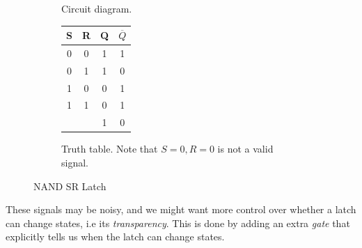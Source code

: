 \begin{definition}[SR Latch]
\begin{figure}[H]
\begin{subfigure}[b]{0.48\textwidth}
        \caption{Circuit diagram.}
      \end{subfigure}
      \hfill 
      \begin{subfigure}[b]{0.48\textwidth}
        \centering
        \begin{tabular}{|c|c|c|c|}
          \hline
          \textbf{S} & \textbf{R} & \textbf{Q} & \textbf{$\overline{Q}$} \\
          \hline
          0 & 0 & 1 & 1 \\
          \hline
          0 & 1 & 1 & 0 \\
          \hline
          1 & 0 & 0 & 1 \\
          \hline
          1 & 1 & 0 & 1 \\
            &   & 1 & 0 \\
          \hline
        \end{tabular}
        \caption{Truth table. Note that $S=0, R=0$ is not a valid signal.}
      \end{subfigure}
      \caption{NAND SR Latch}
    \end{figure}
  \end{definition}

  These signals may be noisy, and we might want more control over whether a latch can change states, i.e its \textit{transparency}. This is done by adding an extra \textit{gate} that explicitly tells us when the latch can change states. 

